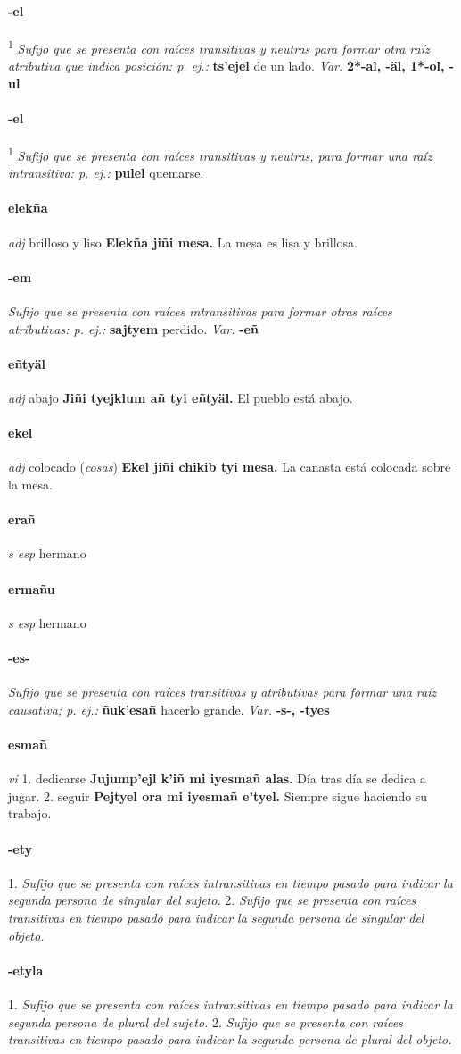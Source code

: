 \documentclass{scrbook}
\newcommand{\entry}[1]{\paragraph{#1}}
\newcommand{\onedefinition}[1]{#1.}
\newcommand{\defsuperscript}[1]{\textsuperscript{1}}
\newcommand{\nontranslationdef}[1]{\textit{#1}}
\newcommand{\partofspeech}[1]{\textit{#1}}
\newcommand{\spanishtranslation}[1]{#1}
\newcommand{\clarification}[1]{(\textit{#1})}
\newcommand{\cholexample}[1]{\textbf{#1}}
\newcommand{\exampletranslation}[1]{#1}
\newcommand{\variation}[1]{\textit{Var.} \textbf{#1}}
\begin{document}
\begin{multicols}{2}
\entry{-el}
\defsuperscript{2}
\nontranslationdef{Sufijo que se presenta con raíces transitivas y neutras para formar otra raíz atributiva que indica posición: p. ej.:}
\cholexample{ts'ejel}
\exampletranslation{de un lado.}
\variation{2*-al, -äl, 1*-ol, -ul}

\entry{-el}
\defsuperscript{3}
\nontranslationdef{Sufijo que se presenta con raíces transitivas y neutras, para formar una raíz intransitiva: p. ej.:}
\cholexample{pulel}
\exampletranslation{quemarse.}

\entry{elekña}
\partofspeech{adj}
\spanishtranslation{brilloso y liso}
\cholexample{Elekña jiñi mesa.}
\exampletranslation{La mesa es lisa y brillosa.}

\entry{-em}
\nontranslationdef{Sufijo que se presenta con raíces intransitivas para formar otras raíces atributivas: p. ej.:}
\cholexample{sajtyem}
\exampletranslation{perdido.}
\variation{-eñ}

\entry{eñtyäl}
\partofspeech{adj}
\spanishtranslation{abajo}
\cholexample{Jiñi tyejklum añ tyi eñtyäl.}
\exampletranslation{El pueblo está abajo.}

\entry{ekel}
\partofspeech{adj}
\spanishtranslation{colocado}
\clarification{cosas}
\cholexample{Ekel jiñi chikib tyi mesa.}
\exampletranslation{La canasta está colocada sobre la mesa.}

\entry{erañ}
\partofspeech{s esp}
\spanishtranslation{hermano}

\entry{ermañu}
\partofspeech{s esp}
\spanishtranslation{hermano}

\entry{-es-}
\nontranslationdef{Sufijo que se presenta con raíces transitivas y atributivas para formar una raíz causativa; p. ej.:}
\cholexample{ñuk'esañ}
\exampletranslation{hacerlo grande.}
\variation{-s-, -tyes}

\entry{esmañ}
\partofspeech{vi}
\onedefinition{1}
\spanishtranslation{dedicarse}
\cholexample{Jujump'ejl k'iñ mi iyesmañ alas.}
\exampletranslation{Día tras día se dedica a jugar.}
\onedefinition{2}
\spanishtranslation{seguir}
\cholexample{Pejtyel ora mi iyesmañ e'tyel.}
\exampletranslation{Siempre sigue haciendo su trabajo.}

\entry{-ety}
\onedefinition{1}
\nontranslationdef{Sufijo que se presenta con raíces intransitivas en tiempo pasado para indicar la segunda persona de singular del sujeto.}
\onedefinition{2}
\nontranslationdef{Sufijo que se presenta con raíces transitivas en tiempo pasado para indicar la segunda persona de singular del objeto.}

\entry{-etyla}
\onedefinition{1}
\nontranslationdef{Sufijo que se presenta con raíces intransitivas en tiempo pasado para indicar la segunda persona de plural del sujeto.}
\onedefinition{2}
\nontranslationdef{Sufijo que se presenta con raíces transitivas en tiempo pasado para indicar la segunda persona de plural del objeto.}


\end{multicols}
\end{document}
